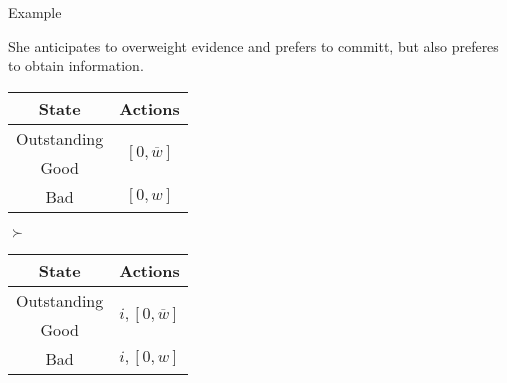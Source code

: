 \documentclass[usenames,dvipsnames,aspectratio=169,11pt, envcountsect, handout]{beamer}
\begin{document}
\begin{frame}{Example}

	She anticipates to overweight evidence and prefers to committ, but also preferes to obtain information.

	\vfill

	\begin{table}[H]
		\centering
		\begin{minipage}{0.29\textwidth}
			\centering
			\begin{tabular}{c | c}
				State                             & Actions                                                                    \\
				\hline
				{\color{bleudefrance}Outstanding} & \multirow{2}{*}{{\color{bleudefrance}\( \left[0, \overline{w} \right] \)}} \\
				{\color{bleudefrance}Good}        &                                                                            \\
				Bad                               & \( \left[0, w \right]\)                                                    \\
			\end{tabular}
			\vspace{0.5cm} %
		\end{minipage}\hspace{0.3cm} %
		\( \succ \) %
		\begin{minipage}{0.29\textwidth}
			\centering
			\begin{tabular}{c | c}
				State                             & Actions                                                                        \\
				\hline
				{\color{bleudefrance}Outstanding} & \multirow{2}{*}{{\color{bleudefrance}\( i, \left[ 0, \overline{w} \right] \)}} \\
				{\color{bleudefrance}Good}        &                                                                                \\
				Bad                               & \(  i, \left[0, w \right] \)                                                   \\
			\end{tabular}
			\vspace{0.5cm} %
		\end{minipage}\hspace{0.3cm} %

\end{table}
\end{frame}
\end{document}
